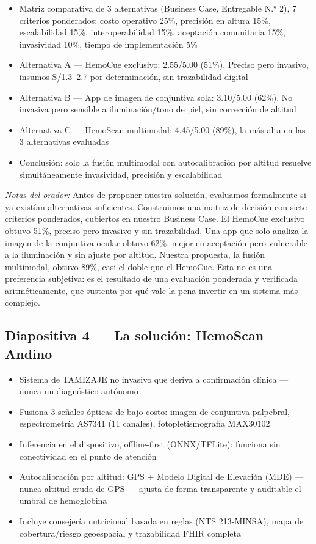 \documentclass[11pt,a4paper]{article}
\providecommand{\tightlist}{%
  \setlength{\itemsep}{0pt}\setlength{\parskip}{0pt}}
\begin{document}
\begin{itemize}
\tightlist
\item
  Matriz comparativa de 3 alternativas (Business Case, Entregable N.° 2), 7 criterios ponderados: costo operativo 25\%, precisión en altura 15\%, escalabilidad 15\%, interoperabilidad 15\%, aceptación comunitaria 15\%, invasividad 10\%, tiempo de implementación 5\%
\item
  Alternativa A --- HemoCue exclusivo: 2.55/5.00 (51\%). Preciso pero invasivo, insumos S/1.3--2.7 por determinación, sin trazabilidad digital
\item
  Alternativa B --- App de imagen de conjuntiva sola: 3.10/5.00 (62\%). No invasiva pero sensible a iluminación/tono de piel, sin corrección de altitud
\item
  Alternativa C --- HemoScan multimodal: 4.45/5.00 (89\%), la más alta en las 3 alternativas evaluadas
\item
  Conclusión: solo la fusión multimodal con autocalibración por altitud resuelve simultáneamente invasividad, precisión y escalabilidad
\end{itemize}

\emph{Notas del orador:} Antes de proponer nuestra solución, evaluamos formalmente si ya existían alternativas suficientes. Construimos una matriz de decisión con siete criterios ponderados, cubiertos en nuestro Business Case. El HemoCue exclusivo obtuvo 51\%, preciso pero invasivo y sin trazabilidad. Una app que solo analiza la imagen de la conjuntiva ocular obtuvo 62\%, mejor en aceptación pero vulnerable a la iluminación y sin ajuste por altitud. Nuestra propuesta, la fusión multimodal, obtuvo 89\%, casi el doble que el HemoCue. Esta no es una preferencia subjetiva: es el resultado de una evaluación ponderada y verificada aritméticamente, que sustenta por qué vale la pena invertir en un sistema más complejo.

\subsection{Diapositiva 4 --- La solución: HemoScan Andino}\label{diapositiva-4-la-soluciuxf3n-hemoscan-andino}

\begin{itemize}
\tightlist
\item
  Sistema de TAMIZAJE no invasivo que deriva a confirmación clínica --- nunca un diagnóstico autónomo
\item
  Fusiona 3 señales ópticas de bajo costo: imagen de conjuntiva palpebral, espectrometría AS7341 (11 canales), fotopletismografía MAX30102
\item
  Inferencia en el dispositivo, offline-first (ONNX/TFLite): funciona sin conectividad en el punto de atención
\item
  Autocalibración por altitud: GPS + Modelo Digital de Elevación (MDE) --- nunca altitud cruda de GPS --- ajusta de forma transparente y auditable el umbral de hemoglobina
\item
  Incluye consejería nutricional basada en reglas (NTS 213-MINSA), mapa de cobertura/riesgo geoespacial y trazabilidad FHIR completa
\end{itemize}
\end{document}
